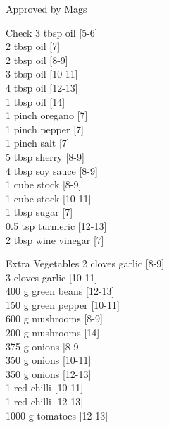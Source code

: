 \begin{menu}{Approved by Mags}
\begin{shoppinglist}{Check}
      3 tbsp oil 
        {\scriptsize[5-6]}\\
      2 tbsp oil 
        {\scriptsize[7]}\\
      2 tbsp oil 
        {\scriptsize[8-9]}\\
      3 tbsp oil 
        {\scriptsize[10-11]}\\
      4 tbsp oil 
        {\scriptsize[12-13]}\\
      1 tbsp oil 
        {\scriptsize[14]}\\
      1 pinch oregano 
        {\scriptsize[7]}\\
      1 pinch pepper 
        {\scriptsize[7]}\\
      1 pinch salt 
        {\scriptsize[7]}\\
      5 tbsp sherry 
        {\scriptsize[8-9]}\\
      4 tbsp soy sauce 
        {\scriptsize[8-9]}\\
      1 cube stock 
        {\scriptsize[8-9]}\\
      1 cube stock 
        {\scriptsize[10-11]}\\
      1 tbsp sugar 
        {\scriptsize[7]}\\
      0.5 tsp turmeric 
        {\scriptsize[12-13]}\\
      2 tbsp wine vinegar 
        {\scriptsize[7]}\\
      \end{shoppinglist}%
      \begin{shoppinglist}{Extra Vegetables}
      2 cloves garlic 
        {\scriptsize[8-9]}\\
      3 cloves garlic 
        {\scriptsize[10-11]}\\
      400 g green beans 
        {\scriptsize[12-13]}\\
      150 g green pepper 
        {\scriptsize[10-11]}\\
      600 g mushrooms 
        {\scriptsize[8-9]}\\
      200 g mushrooms 
        {\scriptsize[14]}\\
      375 g onions 
        {\scriptsize[8-9]}\\
      350 g onions 
        {\scriptsize[10-11]}\\
      350 g onions 
        {\scriptsize[12-13]}\\
      1  red chilli 
        {\scriptsize[10-11]}\\
      1  red chilli 
        {\scriptsize[12-13]}\\
      1000 g tomatoes 
        {\scriptsize[12-13]}\\
      \end{shoppinglist}%
      \par\vfil %
    \vfil\clearpage
  

\end{menu}
